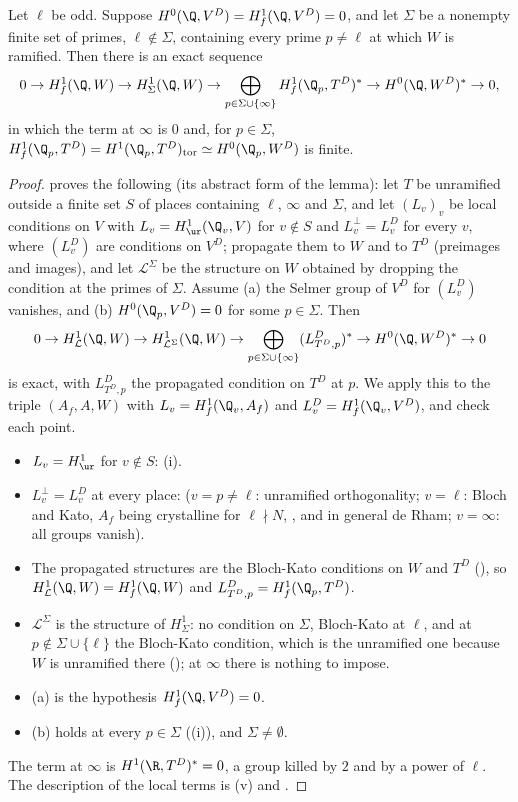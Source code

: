 \begin{lemma}\label{lem:blochkato:dfg21}
Let $\ell$ be odd. Suppose $H^0(\Q,V^D)=H^1_f(\Q,V^D)=0$, and let $\Sigma$ be a nonempty finite set of primes, $\ell\notin\Sigma$, containing every prime $p\ne\ell$ at which $W$ is
ramified. Then there is an exact sequence
\[
0\to H^1_f(\Q,W)\to H^1_\Sigma(\Q,W)\to\bigoplus_{p\in\Sigma\cup\{\infty\}}H^1_f(\Q_p,T^D)^*\to H^0(\Q,W^D)^*\to0,
\]
in which the term at $\infty$ is $0$ and, for $p\in\Sigma$, $H^1_f(\Q_p,T^D)=H^1(\Q_p,T^D)_{\mathrm{tor}}\simeq H^0(\Q_p,W^D)$ is finite.
\end{lemma}

\begin{proof}
 proves the following (its abstract form of the lemma): let $T$ be unramified outside a finite set $S$ of places containing $\ell$, $\infty$ and $\Sigma$, and let
$(L_v)_v$ be local conditions on $V$ with $L_v=H^1_{\ur}(\Q_v,V)$ for $v\notin S$ and $L_v^\perp=L^D_v$ for every $v$, where $(L^D_v)$ are conditions on $V^D$; propagate them to
$W$ and to $T^D$ (preimages and images), and let $\mathcal L^\Sigma$ be the structure on $W$ obtained by dropping the condition at the primes of $\Sigma$. Assume (a) the Selmer
group of $V^D$ for $(L^D_v)$ vanishes, and (b) $H^0(\Q_p,V^D)=0$ for some $p\in\Sigma$. Then
\[
0\to H^1_{\mathcal L}(\Q,W)\to H^1_{\mathcal L^\Sigma}(\Q,W)\to\bigoplus_{p\in\Sigma\cup\{\infty\}}(L^D_{T^D,p})^*\to H^0(\Q,W^D)^*\to0
\]
is exact, with $L^D_{T^D,p}$ the propagated condition on $T^D$ at $p$. We apply this to the triple $(A_f,A,W)$ with $L_v=H^1_f(\Q_v,A_f)$ and $L^D_v=H^1_f(\Q_v,V^D)$, and check
each point.
\begin{itemize}
\item $L_v=H^1_{\ur}$ for $v\notin S$: (i).
\item $L_v^\perp=L^D_v$ at every place:  ($v=p\ne\ell$: unramified orthogonality; $v=\ell$: Bloch and Kato, $A_f$ being crystalline for $\ell\nmid N$,
, and in general de Rham; $v=\infty$: all groups vanish).
\item The propagated structures are the Bloch-Kato conditions on $W$ and $T^D$ (), so $H^1_{\mathcal L}(\Q,W)=H^1_f(\Q,W)$ and $L^D_{T^D,p}=H^1_f(\Q_p,T^D)$.
\item $\mathcal L^\Sigma$ is the structure of $H^1_\Sigma$: no condition on $\Sigma$, Bloch-Kato at $\ell$, and at $p\notin\Sigma\cup\{\ell\}$ the Bloch-Kato condition, which is the unramified one because
$W$ is unramified there (); at $\infty$ there is nothing to impose.
\item (a) is the hypothesis $H^1_f(\Q,V^D)=0$.
\item (b) holds at every $p\in\Sigma$ ((i)), and $\Sigma\ne\emptyset$.
\end{itemize}
The term at $\infty$ is $H^1(\R,T^D)^*=0$, a group killed by $2$ and by a power of $\ell$. The description of the local terms is (v) and
.
\end{proof}


